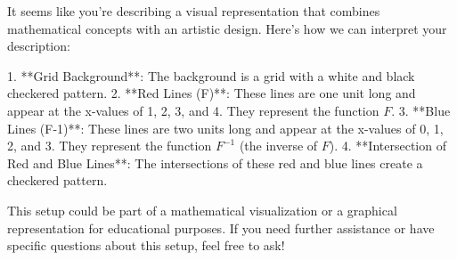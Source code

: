 It seems like you're describing a visual representation that combines mathematical concepts with an artistic design. Here's how we can interpret your description:

1. **Grid Background**: The background is a grid with a white and black checkered pattern.
2. **Red Lines (F)**: These lines are one unit long and appear at the x-values of 1, 2, 3, and 4. They represent the function \( F \).
3. **Blue Lines (F-1)**: These lines are two units long and appear at the x-values of 0, 1, 2, and 3. They represent the function \( F^{-1} \) (the inverse of \( F \)).
4. **Intersection of Red and Blue Lines**: The intersections of these red and blue lines create a checkered pattern.

This setup could be part of a mathematical visualization or a graphical representation for educational purposes. If you need further assistance or have specific questions about this setup, feel free to ask!
